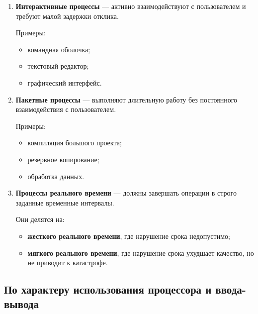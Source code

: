 \documentclass[12pt,a4paper]{article}
\begin{document}
\begin{enumerate}
    \item \textbf{Интерактивные процессы} --- активно взаимодействуют с пользователем и требуют малой задержки отклика.

    Примеры:
    \begin{itemize}
        \item командная оболочка;
        \item текстовый редактор;
        \item графический интерфейс.
    \end{itemize}

    \item \textbf{Пакетные процессы} --- выполняют длительную работу без постоянного взаимодействия с пользователем.

    Примеры:
    \begin{itemize}
        \item компиляция большого проекта;
        \item резервное копирование;
        \item обработка данных.
    \end{itemize}

    \item \textbf{Процессы реального времени} --- должны завершать операции в строго заданные временные интервалы.

    Они делятся на:
    \begin{itemize}
        \item \textbf{жесткого реального времени}, где нарушение срока недопустимо;
        \item \textbf{мягкого реального времени}, где нарушение срока ухудшает качество, но не приводит к катастрофе.
    \end{itemize}
\end{enumerate}

\subsection{По характеру использования процессора и ввода-вывода}
\end{document}
